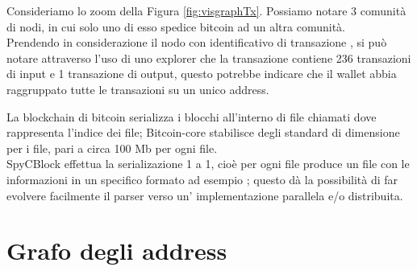 \begin{example}
Consideriamo lo zoom  della Figura \ref{fig:visgraphTx}. Possiamo notare 3 comunità di nodi, in cui solo uno di esso spedice bitcoin ad un altra comunità.\\
  Prendendo in considerazione il nodo con  identificativo di transazione , si può notare attraverso l'uso di uno explorer che la transazione contiene 236 transazioni di input e 1 transazione di output, questo potrebbe indicare che il wallet abbia raggruppato tutte le transazioni su un unico address.
\end{example}

La blockchain di bitcoin serializza i blocchi all'interno di file chiamati  dove  rappresenta l'indice dei file; Bitcoin-core stabilisce degli standard di dimensione per i file, pari a circa 100 Mb per ogni file.\\
SpyCBlock effettua la serializazione 1 a 1, cioè per ogni file  produce un file con le informazioni in un specifico formato ad esempio ; questo dà la possibilità di far evolvere facilmente il parser verso un' implementazione parallela e/o distribuita.

\section{Grafo degli address} \label{sec:solGraphAddress}

